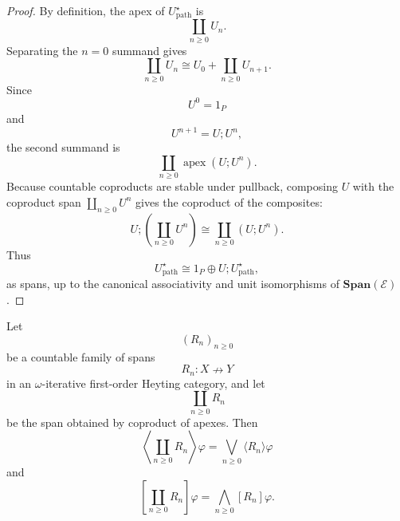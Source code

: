 \begin{proof}
By definition, the apex of \(U^\star_{\mathrm{path}}\) is
\[
\coprod_{n\ge0}U_n.
\]
Separating the \(n=0\) summand gives
\[
\coprod_{n\ge0}U_n
\cong
U_0+\coprod_{n\ge0}U_{n+1}.
\]
Since
\[
U^0=1_P
\]
and
\[
U^{n+1}=U;U^n,
\]
the second summand is
\[
\coprod_{n\ge0}\operatorname{apex}(U;U^n).
\]
Because countable coproducts are stable under pullback, composing \(U\) with the coproduct span \(\coprod_{n\ge0}U^n\) gives the coproduct of the composites:
\[
U;\left(\coprod_{n\ge0}U^n\right)
\cong
\coprod_{n\ge0}(U;U^n).
\]
Thus
\[
U^\star_{\mathrm{path}}
\cong
1_P\oplus U;U^\star_{\mathrm{path}},
\]
as spans, up to the canonical associativity and unit isomorphisms of \(\mathbf{Span}(\mathcal E)\).
\end{proof}

\begin{proposition}
\label{prop:coproduct-span-modalities}
Let
\[
(R_n)_{n\ge0}
\]
be a countable family of spans
\[
R_n:X\nrightarrow Y
\]
in an \(\omega\)-iterative first-order Heyting category, and let
\[
\coprod_{n\ge0}R_n
\]
be the span obtained by coproduct of apexes. Then
\[
\left\langle\coprod_{n\ge0}R_n\right\rangle\varphi
=
\bigvee_{n\ge0}\langle R_n\rangle\varphi
\]
and
\[
\left[\coprod_{n\ge0}R_n\right]\varphi
=
\bigwedge_{n\ge0}[R_n]\varphi.
\]
\end{proposition}

